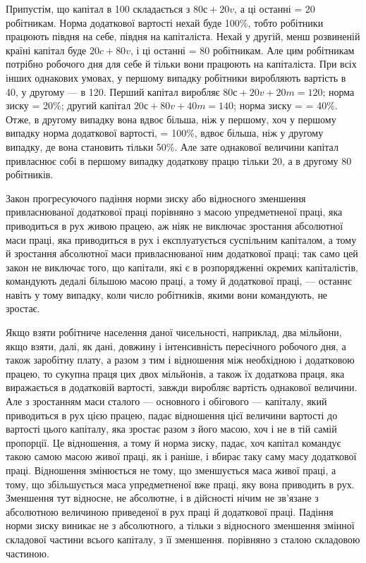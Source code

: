 Припустім, що капітал в 100 складається з $80с + 20v$, а ці
останні = 20 робітникам. Норма додаткової вартості нехай буде
100\%, тобто робітники працюють півдня на себе, півдня на капіталіста.
Нехай у другій, менш розвиненій країні капітал буде
$20c + 80v$, і ці останні = 80 робітникам. Але цим робітникам потрібно
 робочого дня для себе й тільки  вони працюють на
капіталіста. При всіх інших однакових умовах, у першому випадку
робітники виробляють вартість в 40, у другому — в 120.
Перший капітал виробляє $80с + 20v + 20m = 120$; норма зиску =
20\%; другий капітал $20с + 80v + 40m = 140$; норма зиску =
= 40\%. Отже, в другому випадку вона вдвоє більша, ніж у першому,
хоч у першому випадку норма додаткової вартості, = 100\%,
вдвоє більша, ніж у другому випадку, де вона становить тільки
50\%. Але зате однакової величини капітал привласнює собі в першому
випадку додаткову працю тільки 20, а в другому 80 робітників.

Закон прогресуючого падіння норми зиску або відносного
зменшення привласнюваної додаткової праці порівняно з масою
упредметненої праці, яка приводиться в рух живою працею, аж
ніяк не виключає зростання абсолютної маси праці, яка приводиться
в рух і експлуатується суспільним капіталом, а тому й зростання
абсолютної маси привласнюваної ним додаткової праці; так само
цей закон не виключає того, що капітали, які є в розпорядженні
окремих капіталістів, командують дедалі більшою масою праці,
а тому й додаткової праці, — останнє навіть у тому випадку,
коли число робітників, якими вони командують, не зростає.

Якщо взяти робітниче населення даної чисельності, наприклад,
два мільйони, якщо взяти, далі, як дані, довжину і інтенсивність
пересічного робочого дня, а також заробітну плату,
а разом з тим і відношення між необхідною і додатковою працею,
то сукупна праця цих двох мільйонів, а також їх додаткова
праця, яка виражається в додатковій вартості, завжди виробляє
вартість однакової величини. Але з зростанням маси сталого
— основного і обігового — капіталу, який приводиться в рух
цією працею, падає відношення цієї величини вартості до вартості
цього капіталу, яка зростає разом з його масою, хоч і не в тій
самій пропорції. Це відношення, а тому й норма зиску, падає, хоч
капітал командує такою самою масою живої праці, як і раніше,
і вбирає таку саму масу додаткової праці. Відношення змінюється
не тому, що зменшується маса живої праці, а тому, що збільшується
маса упредметненої вже праці, яку вона приводить в рух.
Зменшення тут відносне, не абсолютне, і в дійсності нічим
не зв’язане з абсолютною величиною приведеної в рух праці
й додаткової праці. Падіння норми зиску виникає не з абсолютного,
а тільки з відносного зменшення змінної складової частини
всього капіталу, з її зменшення. порівняно з сталою складовою
частиною.

